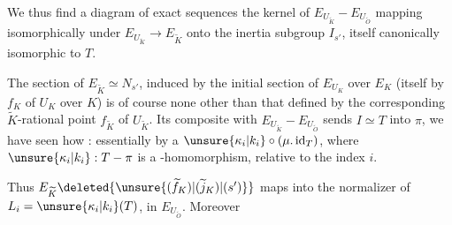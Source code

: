 We thus find a diagram of exact sequences
the kernel  of $E_{U_{\widetilde K}}-E_{U_{\widetilde O}}$ mapping isomorphically under $E_{U_{\widetilde K}}\longrightarrow E_{\widetilde K}$ onto the inertia subgroup $I_{s'}$, itself canonically isomorphic to $T$.

The section of  $E_{\widetilde K}\simeq N_{s'}$, induced by the initial section of $E_{U_K}$ over $E_K$ (itself  by  $f_K$ of $U_K$ over $K$) is of course none other than that defined by the corresponding $\widetilde K$-rational point $f_{\widetilde K}$ of $U_{\widetilde K}$. Its composite with $E_{U_{\widetilde K}}-E_{U_{\widetilde O}}$ sends $I\simeq T$ into $\pi$, we have seen how : essentially by a $\unsure{\kappa_i|k_i}\circ(\mu.\operatorname{id}_T)$, where $\unsure{\kappa_i|k_i}:T-\pi$ is a -homomorphism, relative to the index $i$.

Thus  $E_{\widetilde K}\deleted{\unsure{(\widetilde f_K)|(\widetilde j_K)|(s')}}$ maps into the normalizer of $L_i=\unsure{\kappa_i|k_i}(T)$, in $E_{U_{\widetilde O}}$. Moreover
